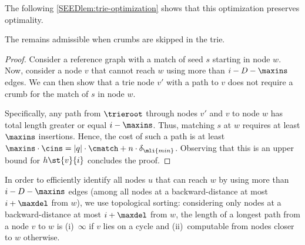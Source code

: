 The following \cref{SEEDlem:trie-optimization} shows that this optimization
preserves optimality.

\begin{lem}
	\label{SEEDlem:trie-optimization}
	The \seedh remains admissible when crumbs are skipped in the trie.
\end{lem}
\begin{proof}
	Consider a reference graph with a match of seed $s$ starting in node $w$.
	Now, consider a node $v$ that cannot reach $w$ using more than $i-D-\maxins$
	edges.
	We can then show that a trie node $v'$ with a path to $v$ does not require a
	crumb for the match of $s$ in node $w$.

	Specifically, any path from $\trieroot$ through nodes $v'$ and $v$ to node
	$w$ has total length greater or equal $i-\maxins$. Thus, matching $s$ at $w$
	requires at least $\maxins$ insertions. Hence, the cost of such a path is at
	least $\maxins \cdot \cins = |q| \cdot \cmatch + n \cdot
	\delta_{\mli{min}}$. Observing that this is an upper bound for $h\st{v}{i}$
	concludes the proof.
\end{proof}

In order to efficiently identify all nodes $u$ that can reach $w$ by using more
than $i-D-\maxins$ edges (among all nodes at a backward-distance at most
$i+\maxdel$ from $w$), we use topological sorting: considering only nodes at a
backward-distance at most $i+\maxdel$ from $w$, the length of a longest path
from a node $v$ to $w$ is (i)~$\infty$ if $v$ lies on a cycle and
(ii)~computable from nodes closer to $w$ otherwise.
